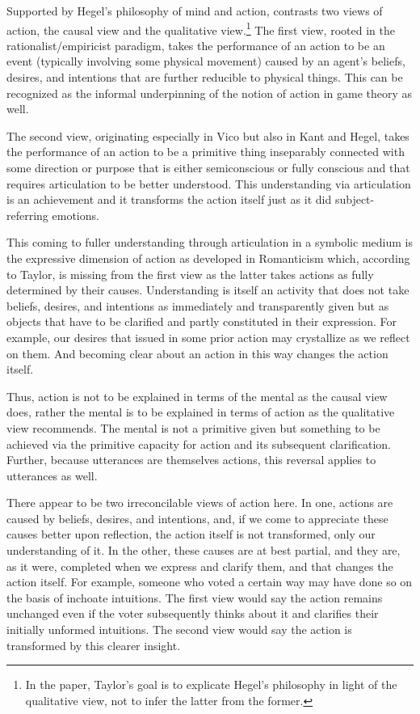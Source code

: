 Supported by Hegel's philosophy of mind and action, \citet{taylor:hpm} contrasts two views of action, the causal view and the qualitative view.\footnote{In the paper, Taylor's goal is to explicate Hegel's philosophy in light of the qualitative view, not to infer the latter from the former.} The first view, rooted in the rationalist/empiricist paradigm, takes the performance of an action to be an event (typically involving some physical movement) caused by an agent's beliefs, desires, and intentions that are further reducible to physical things. This can be recognized as the informal underpinning of the notion of action in game theory as well. 

The second view, originating especially in Vico but also in Kant and Hegel, takes the performance of an action to be a primitive thing inseparably connected with some direction or purpose that is either semiconscious or fully conscious and that requires articulation to be better understood. This understanding via articulation is an achievement and it transforms the action itself just as it did subject-referring emotions. 

This coming to fuller understanding through articulation in a symbolic medium is the expressive dimension of action as developed in Romanticism which, according to Taylor, is missing from the first view as the latter takes actions as fully determined by their causes. Understanding is itself an activity that does not take beliefs, desires, and intentions as immediately and transparently given but as objects that have to be clarified and partly constituted in their expression. For example, our desires that issued in some prior action may crystallize as we reflect on them. And becoming clear about an action in this way changes the action itself.

Thus, action is not to be explained in terms of the mental  as the causal view does, rather the mental is to be explained in terms of action as the qualitative view recommends. The mental is not a primitive given but something to be achieved via the primitive capacity for action and its subsequent clarification. Further, because utterances are themselves actions, this reversal applies to utterances as well.

There appear to be two irreconcilable views of action here. In one, actions are caused by beliefs, desires, and intentions, and, if we come to appreciate these causes better upon reflection, the action itself is not transformed, only our understanding of it. In the other, these causes are at best partial, and they are, as it were, completed when we express and clarify them, and that changes the action itself. For example, someone who voted a certain way may have done so on the basis of inchoate intuitions. The first view would say the action remains unchanged even if the voter subsequently thinks about it and clarifies their initially unformed intuitions. The second view would say the action is transformed by this clearer insight.

